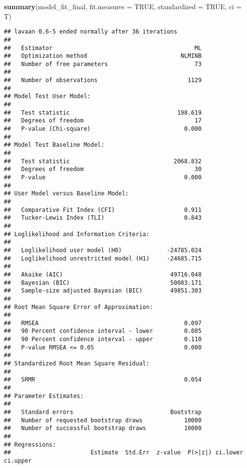 \documentclass[]{article}
\newenvironment{Shaded}{\begin{snugshade}}{\end{snugshade}}
\newcommand{\DataTypeTok}[1]{\textcolor[rgb]{0.13,0.29,0.53}{#1}}
\newcommand{\KeywordTok}[1]{\textcolor[rgb]{0.13,0.29,0.53}{\textbf{#1}}}
\newcommand{\NormalTok}[1]{#1}
\newcommand{\OtherTok}[1]{\textcolor[rgb]{0.56,0.35,0.01}{#1}}
\begin{document}
\begin{Shaded}
\begin{Highlighting}[]
\KeywordTok{summary}\NormalTok{(model_fit_final, }\DataTypeTok{fit.measures =} \OtherTok{TRUE}\NormalTok{, }\DataTypeTok{standardized =} \OtherTok{TRUE}\NormalTok{, }\DataTypeTok{ci =}\NormalTok{ T)}
\end{Highlighting}
\end{Shaded}

\begin{verbatim}
## lavaan 0.6-5 ended normally after 36 iterations
## 
##   Estimator                                         ML
##   Optimization method                           NLMINB
##   Number of free parameters                         73
##                                                       
##   Number of observations                          1129
##                                                       
## Model Test User Model:
##                                                       
##   Test statistic                               198.619
##   Degrees of freedom                                17
##   P-value (Chi-square)                           0.000
## 
## Model Test Baseline Model:
## 
##   Test statistic                              2068.832
##   Degrees of freedom                                30
##   P-value                                        0.000
## 
## User Model versus Baseline Model:
## 
##   Comparative Fit Index (CFI)                    0.911
##   Tucker-Lewis Index (TLI)                       0.843
## 
## Loglikelihood and Information Criteria:
## 
##   Loglikelihood user model (H0)             -24785.024
##   Loglikelihood unrestricted model (H1)     -24685.715
##                                                       
##   Akaike (AIC)                               49716.048
##   Bayesian (BIC)                             50083.171
##   Sample-size adjusted Bayesian (BIC)        49851.303
## 
## Root Mean Square Error of Approximation:
## 
##   RMSEA                                          0.097
##   90 Percent confidence interval - lower         0.085
##   90 Percent confidence interval - upper         0.110
##   P-value RMSEA <= 0.05                          0.000
## 
## Standardized Root Mean Square Residual:
## 
##   SRMR                                           0.054
## 
## Parameter Estimates:
## 
##   Standard errors                            Bootstrap
##   Number of requested bootstrap draws            10000
##   Number of successful bootstrap draws           10000
## 
## Regressions:
##                       Estimate  Std.Err  z-value  P(>|z|) ci.lower ci.upper

\end{verbatim}
\end{document}
